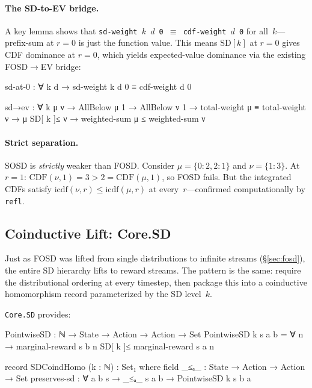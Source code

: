 \documentclass[9pt,a4paper]{article}
\theoremstyle{plain}
\theoremstyle{definition}
\theoremstyle{remark}
\begin{document}
\paragraph{The SD-to-EV bridge.}
A key lemma shows that \texttt{sd-weight~$k$~$d$~0 $\equiv$ cdf-weight~$d$~0} for all~$k$---prefix-sum at $r{=}0$ is just the function value.  This means SD$[k]$ at $r{=}0$ gives CDF dominance at $r{=}0$, which yields expected-value dominance via the existing FOSD$\to$EV bridge:

\begin{spec}
  sd-at-0 : ∀ k d → sd-weight k d 0 ≡ cdf-weight d 0

  sd→ev : ∀ k μ ν →
    AllBelow μ 1 → AllBelow ν 1 →
    total-weight μ ≡ total-weight ν →
    μ SD[ k ]≤ ν →
    weighted-sum μ ≤ weighted-sum ν
\end{spec}

\paragraph{Strict separation.}
SOSD is \emph{strictly} weaker than FOSD.  Consider $\mu = \{0{:}2, 2{:}1\}$ and $\nu = \{1{:}3\}$.  At $r{=}1$: $\text{CDF}(\nu, 1) = 3 > 2 = \text{CDF}(\mu, 1)$, so FOSD fails.  But the integrated CDFs satisfy $\text{icdf}(\nu, r) \le \text{icdf}(\mu, r)$ at every~$r$---confirmed computationally by \texttt{refl}.

\subsection{Coinductive Lift: Core.SD}

Just as FOSD was lifted from single distributions to infinite streams (\S\ref{sec:fosd}), the entire SD hierarchy lifts to reward streams.  The pattern is the same: require the distributional ordering at every timestep, then package this into a coinductive homomorphism record parameterized by the SD level~$k$.

\texttt{Core.SD} provides:

\begin{spec}
  PointwiseSD : ℕ → State → Action → Action → Set
  PointwiseSD k s a b =
    ∀ n → marginal-reward s b n SD[ k ]≤ marginal-reward s a n

  record SDCoindHomo (k : ℕ) : Set₁ where
    field
      _≤ₐ_ : State → Action → Action → Set
      preserves-sd : ∀ a b s →
        _≤ₐ_ s a b → PointwiseSD k s b a
\end{spec}
\end{document}
